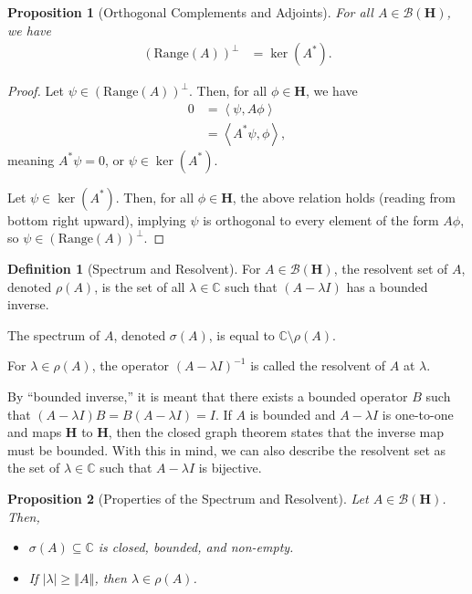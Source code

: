 \documentclass[10pt]{extarticle}
\newcommand{\C}{\mathbb{C}}
\newcommand{\iprod}[2]{\left\langle #1,#2\right\rangle}
\newcommand{\norm}[1]{\left\Vert #1\right\Vert}
\theoremstyle{plain}
\newtheorem*{proposition}{Proposition}%
\theoremstyle{definition}
\newtheorem*{definition}{Definition}
\theoremstyle{remark}
\renewcommand{\newline}{\hfill\break}
\begin{document}
  \begin{proposition}[Orthogonal Complements and Adjoints]
  For all $A\in \mathcal{B}(\mathbf{H})$, we have
  \begin{align*}
    \left(\text{Range}(A)\right)^{\perp} &= \ker(A^{\ast}).
  \end{align*}
  \end{proposition}
  \begin{proof}
    Let $\psi \in \left(\text{Range}(A)\right)^{\perp}$. Then, for all $\phi \in \mathbf{H}$, we have
    \begin{align*}
      0 &= \iprod{\psi}{A\phi}\\
        &= \iprod{A^{\ast}\psi}{\phi},
    \end{align*}
    meaning $A^{\ast}\psi = 0$, or $\psi \in \ker(A^{\ast})$.\newline

    Let $\psi \in \ker(A^{\ast})$. Then, for all $\phi \in \mathbf{H}$, the above relation holds (reading from bottom right upward), implying $\psi$ is orthogonal to every element of the form $A\phi$, so $\psi \in \left(\text{Range}(A)\right)^{\perp}$.
  \end{proof}
  \begin{definition}[Spectrum and Resolvent]
    For $A\in \mathcal{B}(\mathbf{H})$, the resolvent set of $A$, denoted $\rho(A)$, is the set of all $\lambda \in \C$ such that $(A-\lambda I)$ has a bounded inverse.\newline

    The spectrum of $A$, denoted $\sigma(A)$, is equal to $\C\setminus \rho(A)$.\newline

    For $\lambda \in \rho(A)$, the operator $(A - \lambda I)^{-1}$ is called the resolvent of $A$ at $\lambda$.
  \end{definition}
  By ``bounded inverse,'' it is meant that there exists a bounded operator $B$ such that $\left(A - \lambda I\right) B = B \left(A - \lambda I\right) = I$. If $A$ is bounded and $A - \lambda I$ is one-to-one and maps $\mathbf{H}$ to $\mathbf{H}$, then the closed graph theorem states that the inverse map must be bounded. With this in mind, we can also describe the resolvent set as the set of $\lambda \in \C$ such that $A - \lambda I$ is bijective.
  \begin{proposition}[Properties of the Spectrum and Resolvent]
    Let $A\in \mathcal{B}\left(\mathbf{H}\right)$. Then,
    \begin{itemize}
      \item $\sigma(A)\subseteq \C$ is closed, bounded, and non-empty.
      \item If $|\lambda| \geq \norm{A}$, then $\lambda \in \rho(A)$.
    \end{itemize}
  \end{proposition}
\end{document}
